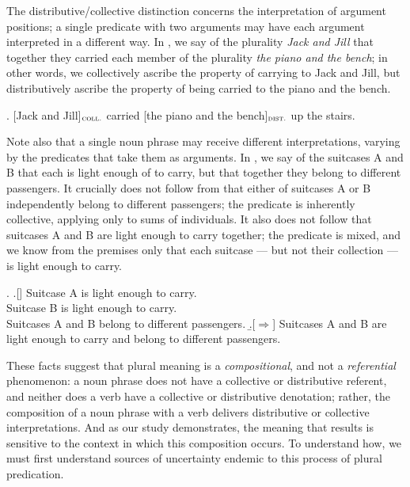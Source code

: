 \documentclass[linguex]{sp}
\newcommand{\op}{$\oplus$}
\begin{document}
The distributive/collective distinction concerns the interpretation of argument positions; a single predicate with two arguments may have each argument interpreted in a different way. In \Next, we say of the plurality \emph{Jack and Jill} that together they carried each member of the plurality \emph{the piano and the bench}; in other words, we collectively ascribe the property of carrying to Jack and Jill, but distributively ascribe the property of being carried to the piano and the bench.

\ex. [Jack and Jill]$_{\textsc{coll.}}$ carried [the piano and the bench]$_{\textsc{dist.}}$ up the stairs.

Note also that a single noun phrase may receive different interpretations, varying by the predicates that take them as arguments. In \Next, we say of the suitcases A and B that each is light enough of to carry, but that together they belong to different passengers. It crucially does not follow from \Next that either of suitcases A or B independently belong to different passengers; the predicate is inherently collective, applying only to sums of individuals. It also does not follow that suitcases A and B are light enough to carry together; the predicate is mixed, and we know from the premises only that each suitcase --- but not their collection --- is light enough to carry.

\ex. \a.[] Suitcase A is light enough to carry.\\
Suitcase B is light enough to carry.\\
Suitcases A and B belong to different passengers.
 \b.[$\Rightarrow$] Suitcases A and B are light enough to carry and belong to different passengers.
 \citep[ex.(3)]{schwarzschild1994}

These facts suggest that plural meaning is a \emph{compositional}, and not a \emph{referential} phenomenon: a noun phrase does not have a collective or distributive referent, and neither does a verb have a collective or distributive denotation; rather, the composition of a noun phrase with a verb delivers distributive or collective interpretations. And as our study demonstrates, the meaning that results is sensitive to the context in which this composition occurs. To understand how, we must first understand sources of uncertainty endemic to this process of plural predication.

\end{document}
